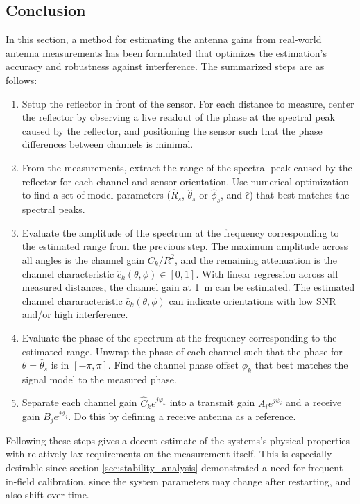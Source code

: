 \subsection{Conclusion}
In this section, a method for estimating the antenna gains from real-world antenna measurements has been formulated
that optimizes the estimation's accuracy and robustness against interference.
The summarized steps are as follows:
\begin{enumerate}
    \item Setup the reflector in front of the sensor.
          For each distance to measure, center the reflector by observing a live readout of the phase at the spectral peak caused by the reflector,
          and positioning the sensor such that the phase differences between channels is minimal.
    \item From the measurements, extract the range of the spectral peak caused by the reflector for each channel and sensor orientation.
          Use numerical optimization to find a set of model parameters ($\hat R_s$, $\hat \theta_s$ or $\hat \phi_s$, and $\hat\epsilon$)
          that best matches the spectral peaks.
    \item Evaluate the amplitude of the spectrum at the frequency corresponding to the estimated range from the previous step.
          The maximum amplitude across all angles is the channel gain $C_k / R^2$,
          and the remaining attenuation is the channel characteristic $\hat c_k(\theta,\phi) \in [0,1]$.
          With linear regression across all measured distances, the channel gain at \SI{1}{\m} can be estimated.
          The estimated channel chararacteristic $\hat c_k(\theta,\phi)$ can indicate orientations with low SNR and/or high interference.
    \item Evaluate the phase of the spectrum at the frequency corresponding to the estimated range.
          Unwrap the phase of each channel such that the phase for $\theta = \hat \theta_s$ is in $[-\pi,\pi]$.
          Find the channel phase offset $\phi_k$ that best matches the signal model to the measured phase.
    \item Separate each channel gain $\hat C_ke^{j\varphi_k}$ into a transmit gain $A_i e^{j\psi_i}$ and a receive gain $B_j e^{j\vartheta_j}$.
          Do this by defining a receive antenna as a reference.
\end{enumerate}

Following these steps gives a decent estimate of the systems's physical properties with relatively lax requirements on the measurement itself.
This is especially desirable since section \ref{sec:stability_analysis} demonstrated a need for frequent in-field calibration,
since the system parameters may change after restarting, and also shift over time. \\

